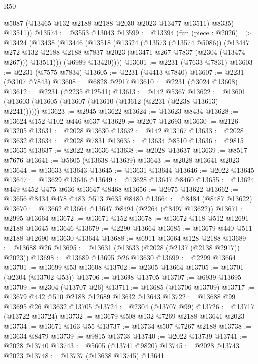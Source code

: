 \begin{lexlean}{R50}
\begin{coremodule}
          @5087
          (@13465 @132 @2188 @2188 @2030 @2023 @13477 @13511)
          @8335)
        @13511))
@13574 := @3553 @13043
@13599 := @13394
    (fun (piece : @2026) =>
    @13424
      (@13438
        (@13446
          (@13518
            (@13524
              (@13573 (@13574 @5086))
              (@13447
                @272
                @132
                @2188
                @2188
                @7837
                @2023
                (@13471 @267 @7837 (@2304 (@13474 @267)))
                @13511)))
          (@6989 @13420))))
@13601 := @2231 (@7633 @7831)
@13603 := @2231 (@7575 @7834)
@13605 := @2231 (@4413 @7840)
@13607 := @2231 (@3107 @7843)
@13608 := @6828 @2917
@13610 := @2231 (@3024 @13608)
@13612 := @2231 (@2235 @12541)
@13613 := @142 @5367
@13622 := @13601 (@13603 (@13605 (@13607 (@13610 (@13612 (@2231 (@2238 @13613) @2241))))))
@13623 := @2945 @13622
@13624 := @13623 @8434
@13628 := @13624 @152 @102 @446 @637
@13629 := @2207 @12693
@13630 := @2126 @13205
@13631 := @2028 @13630
@13632 := @142 @13167
@13633 := @2028 @13632
@13634 := @2028 @7831
@13635 := @13634 @8510
@13636 := @9815 @13635
@13637 := @2022 @13636
@13638 := @2028 @13637
@13639 := @8517 @7676
@13641 := @5605 (@13638 @13639)
@13643 := @2028 @13641 @2023
@13644 := @13633 @13643
@13645 := @13631 @13644
@13646 := @2022 @13645
@13647 := @13629 @13646
@13649 := @13628 @13647 @8460
@13655 := @13624 @449 @452 @475 @636 @13647 @8468
@13656 := @2975 @13622
@13662 := @13656 @8434 @478 @483 @513 @635 @8480
@13664 := @8484 (@8487 @13622)
@13670 := @13662 @13664 @13647 @8494 (@2264 (@8497 @13622))
@13671 := @2995 @13664
@13672 := @13671 @152
@13678 := @13672 @118 @512 @12691 @2188 @13645 @13646
@13679 := @2290 @13664
@13685 := @13679 @440 @511 @2188 @12690 @13630 @13644
@13688 := @6911 @13664 @128 @2188
@13689 := @13688 @26
@13695 := @13631 (@13633 (@2028 (@2137 (@2138 @2917)) @2023))
@13698 := @13689 @13695 @26 @13630
@13699 := @2299 @13664
@13701 := @13699 @53 @13608
@13702 := @2305 @13664
@13705 := @13701 (@2304 (@13702 @53))
@13706 := @13698 @13705
@13707 := @6939 @13695
@13709 := @2304 (@13707 @26)
@13711 := @13685 (@13706 @13709)
@13717 := @13679 @442 @510 @2188 @12689 @13632 @13643
@13722 := @13688 @99 @13695 @26 @13632 @13705
@13724 := @2304 (@13707 @99)
@13726 := @13717 (@13722 @13724)
@13732 := @13679 @508 @132 @7269 @2188 @13641 @2023
@13734 := @13671 @163 @55
@13737 := @13734 @507 @7267 @2188
@13738 := @13634 @8479
@13739 := @9815 @13738
@13740 := @2022 @13739
@13741 := @2028 @13740
@13743 := @5605 (@13741 @9820)
@13745 := @2028 @13743 @2023
@13748 := @13737 (@13638 @13745) @13641

\end{coremodule}
\end{lexlean}

